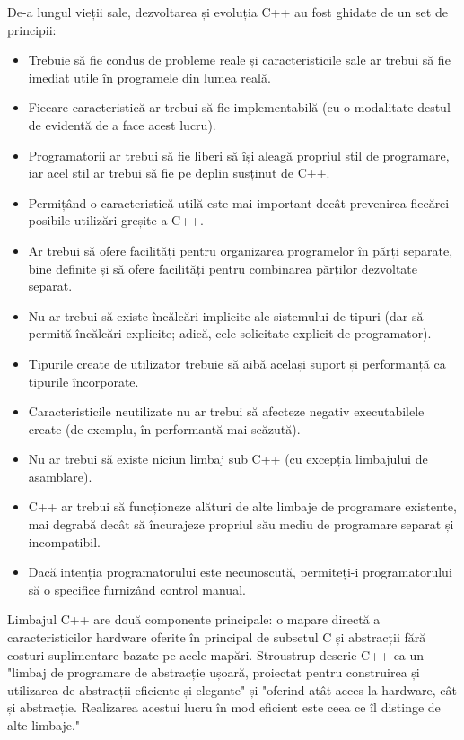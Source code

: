 \documentclass[a4paper,12pt]{report}
\begin{document}
De-a lungul vieții sale, dezvoltarea și evoluția C++ au fost ghidate de un set de principii:
\begin{itemize}
    \item Trebuie să fie condus de probleme reale și caracteristicile sale ar trebui să fie imediat utile în programele din lumea reală.
    \item Fiecare caracteristică ar trebui să fie implementabilă (cu o modalitate destul de evidentă de a face acest lucru).
    \item Programatorii ar trebui să fie liberi să își aleagă propriul stil de programare, iar acel stil ar trebui să fie pe deplin susținut de C++.
    \item Permițând o caracteristică utilă este mai important decât prevenirea fiecărei posibile utilizări greșite a C++.
    \item Ar trebui să ofere facilități pentru organizarea programelor în părți separate, bine definite și să ofere facilități pentru combinarea părților dezvoltate separat.
    \item Nu ar trebui să existe încălcări implicite ale sistemului de tipuri (dar să permită încălcări explicite; adică, cele solicitate explicit de programator).
    \item Tipurile create de utilizator trebuie să aibă același suport și performanță ca tipurile încorporate.
    \item Caracteristicile neutilizate nu ar trebui să afecteze negativ executabilele create (de exemplu, în performanță mai scăzută).
    \item Nu ar trebui să existe niciun limbaj sub C++ (cu excepția limbajului de asamblare).
    \item C++ ar trebui să funcționeze alături de alte limbaje de programare existente, mai degrabă decât să încurajeze propriul său mediu de programare separat și incompatibil.
    \item Dacă intenția programatorului este necunoscută, permiteți-i programatorului să o specifice furnizând control manual.
\end{itemize}

Limbajul C++ are două componente principale: o mapare directă a caracteristicilor hardware oferite în principal de subsetul C și abstracții fără costuri suplimentare bazate pe acele mapări. Stroustrup descrie C++ ca un "limbaj de programare de abstracție ușoară, proiectat pentru construirea și utilizarea de abstracții eficiente și elegante" și "oferind atât acces la hardware, cât și abstracție. Realizarea acestui lucru în mod eficient este ceea ce îl distinge de alte limbaje."
\end{document}
